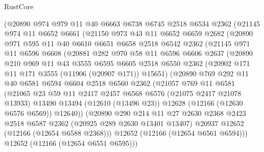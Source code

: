 \begin{lexlean}{RustCore}
\begin{coremodule}
    (@20890
      @974
      @979
      @11
      @40
      @6663
      @6738
      @6745
      @2518
      @6534
      @2362
      (@21145
        @974
        @11
        @6652
        @6661
        (@21150
          @973
          @43
          @11
          @6652
          @6659
          @2682
          (@20890
            @971
            @595
            @11
            @40
            @6610
            @6651
            @6658
            @2518
            @6542
            @2362
            (@21145
              @971
              @11
              @6596
              @6608
              (@20881
                @282
                @970
                @58
                @11
                @6596
                @6606
                @2637
                (@20890
                  @210
                  @969
                  @11
                  @43
                  @3555
                  @6595
                  @6605
                  @2518
                  @6550
                  @2362
                  (@20902 @171 @11 @171 @3555 (@11906 (@20907 @171)) @15651)
                  (@20890
                    @769
                    @292
                    @11
                    @40
                    @6581
                    @6594
                    @6604
                    @2518
                    @6560
                    @2362
                    (@21057
                      @769
                      @11
                      @6581
                      (@21065
                        @23
                        @59
                        @11
                        @2417
                        @2457
                        @6568
                        @6576
                        (@21075 @2417 @21078 @13933)
                        @13490
                        @13494
                        (@12610 (@13496 @23))
                        @12628
                        (@12166 (@12630 @6576 @6569))
                        @12640))
                    (@20890
                      @290
                      @214
                      @11
                      @27
                      @2630
                      @2368
                      @2423
                      @2518
                      @6587
                      @2362
                      (@20925 @289 @2630 @13401 @13407)
                      @20937
                      @12652
                      (@12166 (@12654 @6588 @2368)))
                    @12652
                    (@12166 (@12654 @6561 @6594)))
                  @12652
                  (@12166 (@12654 @6551 @6595)))

\end{coremodule}
\end{lexlean}
